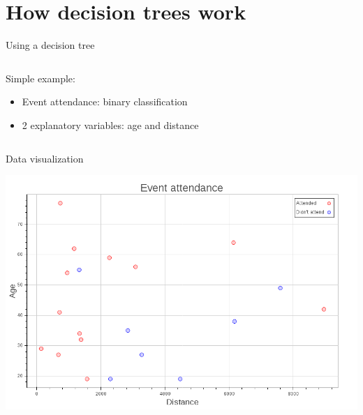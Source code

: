 \section{How decision trees work}

\begin{frame}[fragile]{Using a decision tree}
    \begin{columns}
     \begin{column}{.49\textwidth}
        Simple example:
        \begin{itemize}
            \item Event attendance: binary classification
            \item 2 explanatory variables: age and distance
        \end{itemize}
     \end{column}
    
     \begin{column}{.49\textwidth}
        
     \end{column}
    \end{columns}
\end{frame}

\begin{frame}[fragile]{Data visualization}
    \begin{center}
        \includegraphics[scale=.25]{images/event_attendance}
    \end{center}
\end{frame}

